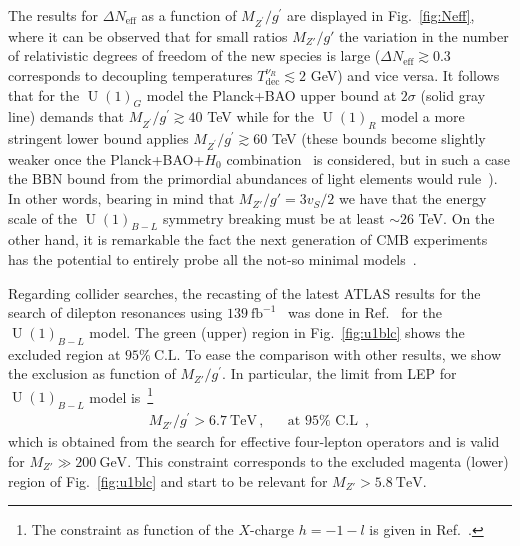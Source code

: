 \documentclass[12pt]{article}
\begin{document}
The results for $\Delta N_{\text{eff}}$ as a function of $M_{Z^{\prime}}/g^{\prime}$ are displayed in Fig.~\ref{fig:Neff}, where it can be observed that for small ratios $M_{Z'}/g'$  the variation in the number of relativistic degrees of freedom of the new species is large ($\Delta N_{\text{eff}}\gtrsim0.3$ corresponds to decoupling temperatures $T^{\nu_R}_{\text{dec}}\lesssim2$ GeV) and vice versa.
It follows that for the $\operatorname{U}(1)_{G}$ model the Planck+BAO upper bound at $2\sigma$ (solid gray line) demands that $M_{Z^{\prime}}/g^{\prime} \gtrsim 40$ TeV while for the $\operatorname{U}(1)_{R}$ model a more stringent lower bound applies $M_{Z^{\prime}}/g^{\prime} \gtrsim 60$ TeV (these bounds become slightly weaker once the Planck+BAO+$H_0$ combination~\cite{Aghanim:2018eyx} is considered, but in such a case the BBN bound from the primordial abundances of light elements would rule~\cite{Pitrou:2018cgg}). 
In other words, bearing in mind that $M_{Z'}/g'=3v_S/2$ we have that the energy scale of the $\operatorname{U}(1)_{B-L}$ symmetry breaking must be at least $\sim26$ TeV.      
On the other hand, it is remarkable the fact the next generation of CMB experiments~\cite{Benson:2014qhw,Abitbol:2019nhf} has the potential to entirely probe all the not-so minimal models~\cite{Abazajian:2019oqj}.  



Regarding collider searches, the recasting of the latest ATLAS results for the search of dilepton resonances using $139\ \text{fb}^{-1}$~\cite{Aad:2019fac} was done
in Ref.~\cite{Chiang:2019ajm} for the $\operatorname{U}(1)_{B-L}$ model.
The green (upper) region in Fig.~\ref{fig:u1blc} shows the excluded region at $95\%\ \text{C.L.}$ To ease the comparison with other results, we show the exclusion as function of $M_{Z'}/g^{\prime}$. In particular, the limit from LEP for $\operatorname{U}(1)_{B-L}$ model is~\cite{Carena:2004xs,Heeck:2014zfa}\footnote{The constraint as function of the $X$-charge $h=-1-l$ is given in Ref.~\cite{Okada:2016tci}. }
\begin{align} 
  M_{Z'}/g^{\prime}>6.7\ \text{TeV}\,,&&\text{at $95\%$ C.L }\,,
\end{align}
which is obtained from the search for effective four-lepton operators and is valid for $M_{Z'}\gg 200\ \text{GeV}$. This constraint corresponds to the excluded magenta (lower) region of Fig.~\ref{fig:u1blc} and start to be relevant for $M_{Z'}>5.8\ \text{TeV}$.
\end{document}
